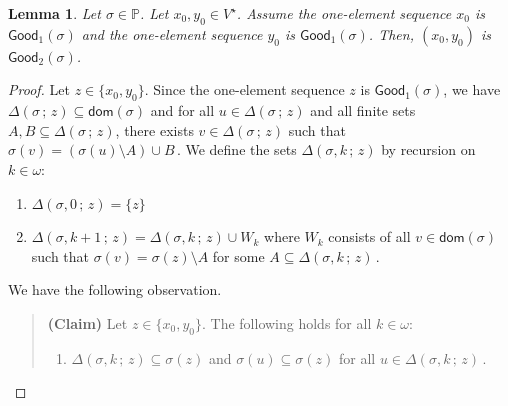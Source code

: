 \documentclass[10pt,a4paper, openany,  oldfontcommands]{memoir}
\newtheorem{lemma} [theorem] {Lemma}
\newtheorem{open problem} [theorem] {Open Problem}
\begin{document}
 \begin{lemma}    \label{SecondLemmaGood}
 Let  $  \sigma  \in  \mathbb{P} $. 
Let  $  x_0, y_0  \in  V^{  \star }  $. 
Assume the one-element sequence $  x_0$  is  $  \mathsf{Good}_1  \left(  \sigma \right) $
and   the one-element sequence $  y_0$  is  $  \mathsf{Good}_1  \left(  \sigma \right) $. 
Then,  $  (x_0,  y_0)  $  is     $  \mathsf{Good}_2  \left(  \sigma \right) $. 
 \end{lemma}
\begin{proof}

Let  $  z  \in  \lbrace  x_0, y_0  \rbrace $. 
Since the one-element sequence $z $  is  $   \mathsf{Good}_1  \left(  \sigma  \right)  $, 
we have  $    \Delta \left(  \sigma   \,  ;   \,   z  \right)    \subseteq     \mathsf{dom} \left(  \sigma  \right)   $  
and for all $  u  \in    \Delta \left(  \sigma   \,  ;   \,   z  \right)    $  and  all finite  sets  $  A , B \subseteq   \Delta \left(  \sigma   \,  ;   \,   z  \right)   $, 
there exists  $  v  \in    \Delta \left(  \sigma   \,  ;   \,   z  \right)    $  such that  
$  \sigma (v)  =   \left(   \sigma (u)  \setminus   A   \right)  \cup   B      \,     $. 
We define the sets  $  \Delta \left(  \sigma , k  \,  ;   \,   z  \right)  $  by recursion on  $ k  \in  \omega   $: 
\begin{enumerate}
\item  $  \Delta \left(  \sigma , 0 \,  ;   \,   z  \right)   =  \lbrace   z  \rbrace $ 




\item   $  \Delta \left(  \sigma , k +1  \,  ;   \,   z  \right)   =   \Delta \left(  \sigma , k  \,  ;   \,   z  \right)   \cup  W_k  $ 
where  $  W_k $  consists of all $  v  \in  \mathsf{dom} \left(  \sigma  \right)  $  such that 
$  \sigma (v)  =    \sigma (z)  \setminus  A   $  for some  $  A  \subseteq     \Delta \left(  \sigma , k  \,  ;   \,   z \right)        \,    $.
\end{enumerate} 
We   have the following observation. 







  \begin{quote} {\bf (Claim)} \;\;\;\;\;\;    
  Let   $   z  \in    \lbrace  x_0,  y_0  \rbrace   $. 
  The following holds for all  $  k  \in   \omega   $: 
  \begin{enumerate}
  \item    $    \Delta \left(  \sigma , k   \,  ;   \,   z  \right)     \subseteq   \sigma (z)       $
  and  $  \sigma (u)  \subseteq   \sigma (z)  $  for all  $  u \in       \Delta \left(  \sigma , k   \,  ;   \,   z  \right)     \,    $. 
  

\end{enumerate}
\end{quote}
\end{proof}
\end{document}
